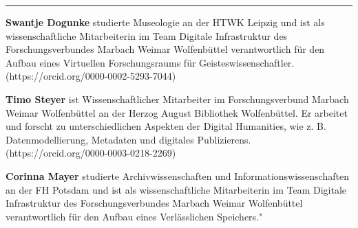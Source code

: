 \begin{center}\rule{0.5\linewidth}{\linethickness}\end{center}

\textbf{Swantje Dogunke} studierte Museologie an der HTWK Leipzig und
ist als wissenschaftliche Mitarbeiterin im Team Digitale Infrastruktur
des Forschungsverbundes Marbach Weimar Wolfenbüttel verantwortlich für
den Aufbau eines Virtuellen Forschungsraums für Geisteswissenschaftler.
(https://orcid.org/0000-0002-5293-7044)

\textbf{Timo Steyer} ist Wissenschaftlicher Mitarbeiter im
Forschungsverbund Marbach Weimar Wolfenbüttel an der Herzog August
Bibliothek Wolfenbüttel. Er arbeitet und forscht zu unterschiedlichen
Aspekten der Digital Humanities, wie z. B. Datenmodellierung, Metadaten
und digitales Publizierens. (https://orcid.org/0000-0003-0218-2269)

\textbf{Corinna Mayer} studierte Archivwissenschaften und
Informationswissenschaften an der FH Potsdam und ist als
wissenschaftliche Mitarbeiterin im Team Digitale Infrastruktur des
Forschungsverbundes Marbach Weimar Wolfenbüttel verantwortlich für den
Aufbau eines Verlässlichen Speichers."
